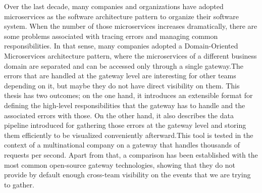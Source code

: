 Over the last decade, many companies and organizations have adopted microservices as the software architecture pattern to organize their software system. When the number of those microservices increases dramatically, there are some problems associated with tracing errors and managing common responsibilities. In that sense, many companies adopted a Domain-Oriented Microservices architecture pattern, where the microservices of a different business domain are separated and can be accessed only through a single gateway.The errors that are handled at the gateway level are interesting for other teams depending on it, but maybe they do not have direct visibility on them. This thesis has two outcomes; on the one hand, it introduces an extensible format for defining the high-level responsibilities that the gateway has to handle and the associated errors with those. On the other hand, it also describes the data pipeline introduced for gathering those errors at the gateway level and storing them efficiently to be visualized conveniently afterward.This tool is tested in the context of a multinational company on a gateway that handles thousands of requests per second. Apart from that, a comparison has been established with the most common open-source gateway technologies, showing that they do not provide by default enough cross-team visibility on the events that we are trying to gather.